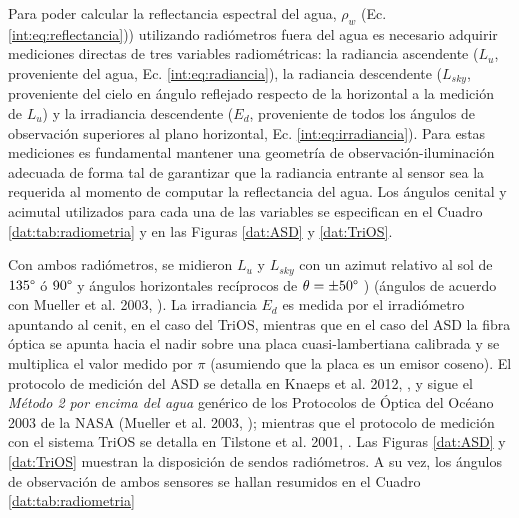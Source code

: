     Para poder calcular la reflectancia espectral del agua, $\rho_{w}$ (Ec. \ref{int:eq:reflectancia})) utilizando radiómetros fuera del agua es necesario adquirir mediciones directas de tres variables radiométricas: la radiancia ascendente ($L_{u}$, proveniente del agua, Ec. \ref{int:eq:radiancia}), la radiancia descendente ($L_{sky}$, proveniente del cielo en ángulo reflejado respecto de la horizontal a la medición de $L_{u}$) y la irradiancia descendente ($E_{d}$, proveniente de todos los ángulos de observación superiores al plano horizontal, Ec. \ref{int:eq:irradiancia}). Para estas mediciones es fundamental mantener una geometría de observación-iluminación adecuada de forma tal de garantizar que la radiancia entrante al sensor sea la requerida al momento de computar la reflectancia del agua. Los ángulos cenital y acimutal utilizados para cada una de las variables se especifican en el Cuadro \ref{dat:tab:radiometria} y en las Figuras \ref{dat:ASD} y \ref{dat:TriOS}.
    
    Con ambos radiómetros, se midieron $L_{u}$ y $L_{sky}$ con un azimut relativo al sol de $135 \degree$ ó $ 90 \degree$ y ángulos horizontales recíprocos de $\theta = \pm 50\degree$ ) (ángulos de acuerdo con Mueller et al. 2003, \cite{mueller2003}). La irradiancia $E_{d}$ es medida por el irradiómetro apuntando al cenit, en el caso del TriOS, mientras que en el caso del ASD la fibra óptica se apunta hacia el nadir sobre una placa cuasi-lambertiana calibrada y se multiplica el valor medido por $\pi$ (asumiendo que la placa es un emisor coseno).
    El protocolo de medición del ASD se detalla en Knaeps et al. 2012, \cite{knaeps2012}, y sigue el \textit{Método 2 por encima del agua} genérico de los Protocolos de Óptica del Océano 2003 de la NASA (Mueller et al. 2003, \cite{mueller2003}); mientras que el protocolo de medición con el sistema TriOS se detalla en Tilstone et al. 2001, \cite{tilstone2001}.
    Las Figuras \ref{dat:ASD} y \ref{dat:TriOS} muestran la disposición de sendos radiómetros. A su vez, los ángulos de observación de ambos sensores se hallan resumidos en el Cuadro \ref{dat:tab:radiometria}
    

